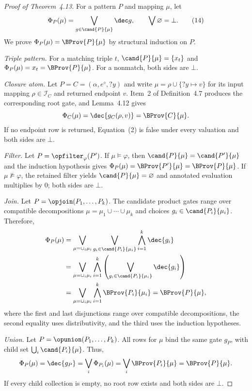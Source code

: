 \documentclass[sigconf, nonacm]{acmart}
\begin{document}
\begin{proof}[Proof of Theorem~4.13]
For a pattern $P$ and mapping $\mu$, let
\[
 \Phi_P(\mu)=\bigvee_{g\in\cand{P}{\mu}}\dec g,
 \qquad \bigvee\varnothing=\bot.
 \tag{14}\label{eq:candidate-formula}
\]
We prove $\Phi_P(\mu)=\BProv{P}{\mu}$ by structural induction on $P$.

\emph{Triple pattern.} For a matching triple $t$, $\cand{P}{\mu}=\{x_t\}$ and
$\Phi_P(\mu)=x_t=\BProv{P}{\mu}$. For a nonmatch, both sides are $\bot$.

\emph{Closure atom.} Let $P=C=(\alpha,e^\diamond,?y)$ and write $\mu=\rho\cup\{?y\mapsto v\}$ for its input mapping $\rho\in\mathcal I_C$ and returned endpoint $v$. Item~2 of Definition~4.7 produces the corresponding root gate, and Lemma~4.12 gives
\[
 \Phi_C(\mu)=\dec{g_C(\rho,v)}=\BProv{C}{\mu}.
\]
If no endpoint row is returned, Equation~(2) is false under every valuation and both sides are $\bot$.

\emph{Filter.} Let $P=\opfilter_\varphi(P')$. If $\mu\models\varphi$, then $\cand{P}{\mu}=\cand{P'}{\mu}$ and the induction hypothesis gives $\Phi_P(\mu)=\BProv{P'}{\mu}=\BProv{P}{\mu}$. If $\mu\not\models\varphi$, the retained filter yields $\cand{P}{\mu}=\varnothing$ and annotated evaluation multiplies by $0$; both sides are $\bot$.

\emph{Join.} Let $P=\opjoin(P_1,\ldots,P_k)$. The candidate product gates range over compatible decompositions $\mu=\mu_1\cup\cdots\cup\mu_k$ and choices $g_i\in\cand{P_i}{\mu_i}$. Therefore,
\begin{align*}
 \Phi_P(\mu)
 &=\bigvee_{\mu=\cup_i\mu_i}
   \bigvee_{g_i\in\cand{P_i}{\mu_i}}
   \bigwedge_{i=1}^{k}\dec{g_i}\\
 &=\bigvee_{\mu=\cup_i\mu_i}
   \bigwedge_{i=1}^{k}
   \left(\bigvee_{g_i\in\cand{P_i}{\mu_i}}\dec{g_i}\right)\\
 &=\bigvee_{\mu=\cup_i\mu_i}
   \bigwedge_{i=1}^{k}\BProv{P_i}{\mu_i}
 =\BProv{P}{\mu},
\end{align*}
where the first and last disjunctions range over compatible decompositions, the second equality uses distributivity, and the third uses the induction hypotheses.

\emph{Union.} Let $P=\opunion(P_1,\ldots,P_k)$. All rows for $\mu$ bind the same gate $g_P$, with child set $\bigcup_i\cand{P_i}{\mu}$. Thus,
\[
 \Phi_P(\mu)=\dec{g_P}
 =\bigvee_i\Phi_{P_i}(\mu)
 =\bigvee_i\BProv{P_i}{\mu}
 =\BProv{P}{\mu}.
\]
If every child collection is empty, no root row exists and both sides are $\bot$.


\end{proof}
\end{document}
